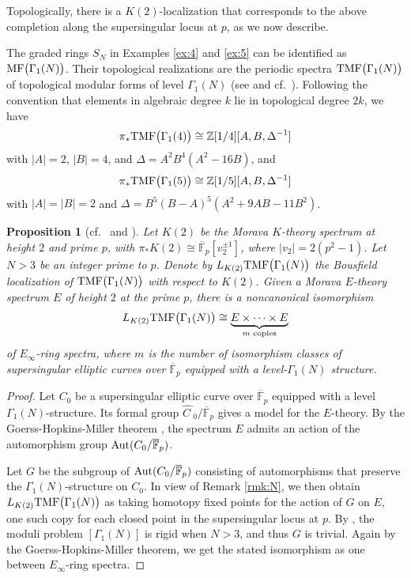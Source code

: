 \documentclass{gtpart}
\newtheorem{prop}[equation]{Proposition}
\theoremstyle{definition}
\theoremstyle{remark}
\newcommand{\mb}[1]{\mathbb{#1}}
\newcommand{\Aut}{{\rm Aut}}
\newcommand{\cF}{\overline {\mb F}}
\newcommand{\BZ}{{\mb Z}}
\newcommand{\HC}{\widehat{C~}\!}
\newcommand{\TMF}{{\rm TMF}}
\newcommand{\MF}{{\rm MF}}
\renewcommand{\D}{\Delta}
\newcommand{\G}{\Gamma}
\renewcommand{\=}{\approx}
\renewcommand{\-}{\sim}
\numberwithin{equation}{section}
\begin{document}
Topologically, there is a $K(2)$-localization that corresponds to the above 
completion along the supersingular locus at $p$, as we now describe.  

The graded rings $S_N$ in Examples \ref{ex:4} and \ref{ex:5} can be identified 
as $\MF\big(\G_1(N)\big)$.  Their topological realizations are the periodic 
spectra $\TMF\big(\G_1(N)\big)$ of topological modular forms of level $\G_1(N)$ 
(see \cite[Section 2]{tmf3} and cf.~\cite{logetaletmf}).  Following the 
convention that elements in algebraic degree $k$ lie in topological degree 
$2 k$, we have 
\[
 \pi_* \TMF\big(\G_1(4)\big) \cong \BZ[1/4][A, B, \D^{-1}] 
\]
with $|A| = 2$, $|B| = 4$, and $\D = A^2 B^4 (A^2 - 16 B)$, and 
\[
 \pi_* \TMF\big(\G_1(5)\big) \cong \BZ[1/5][A, B, \D^{-1}] 
\]
with $|A| = |B| = 2$ and $\D = B^5 (B - A)^5 (A^2 + 9 A B - 11 B^2)$.  

\begin{prop}[{cf.~\cite[Section 3.5]{BOSS} and 
\cite[Corollary on page 20]{Tnf}}]
 \label{prop:tmfe}
 Let $K(2)$ be the Morava $K$-theory spectrum at height $2$ and prime $p$, with 
 $\pi_* K(2) \cong \cF_p [v_2^{\pm 1}]$, where $|v_2| = 2 (p^2 - 1)$.  Let 
 $N > 3$ be an integer prime to $p$.  Denote by $L_{K(2)} \TMF\big(\G_1(N)\big)$ 
 the Bousfield localization of $\TMF\big(\G_1(N)\big)$ with respect to $K(2)$.  
 Given a Morava $E$-theory spectrum $E$ of height $2$ at the prime $p$, there is 
 a noncanonical isomorphism 
 \[
  L_{K(2)} \TMF\big(\G_1(N)\big) \cong 
  \underbrace{E \times \cdots \times E}_\text{$m$ copies} 
 \]
 of $E_\infty$-ring spectra, where $m$ is the number of isomorphism classes of 
 supersingular elliptic curves over $\cF_p$ equipped with a level-$\G_1(N)$ 
 structure.  
\end{prop}

\begin{proof}
 Let $C_0$ be a supersingular elliptic curve over $\cF_p$ equipped with a level 
 $\G_1(N)$-structure.  Its formal group $\HC_0 / \cF_p$ gives a model for the 
 $E$-theory.  By the Goerss-Hopkins-Miller theorem \cite[Corollary 7.6]{GH}, the 
 spectrum $E$ admits an action of the automorphism group $\Aut(C_0 / \cF_p)$.  

 Let $G$ be the subgroup of $\Aut(C_0 / \cF_p)$ consisting of automorphisms that 
 preserve the $\G_1(N)$-structure on $C_0$.  In view of Remark \ref{rmk:N}, we 
 then obtain $L_{K(2)} \TMF\big(\G_1(N)\big)$ as taking homotopy fixed points 
 for the action of $G$ on $E$, one such copy for each closed point in the 
 supersingular locus at $p$.  By \cite[Corollary 2.7.4]{KM}, the moduli problem 
 $[\G_1(N)]$ is rigid when $N > 3$, and thus $G$ is trivial.  Again by the 
 Goerss-Hopkins-Miller theorem, we get the stated isomorphism as one between 
 $E_\infty$-ring spectra.  
\end{proof}
\end{document}
